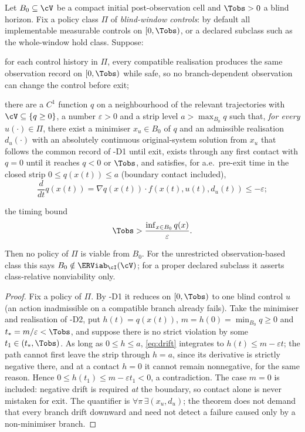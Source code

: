 \begin{theorem}\label{thm:delayed}
Let $B_0\subseteq\cV$ be a compact initial post-observation cell and $\Tobs>0$ a blind horizon. Fix a policy class $\Pi$ of \emph{blind-window controls}: by default all implementable measurable controls on $[0,\Tobs)$, or a declared subclass such as the whole-window hold class. Suppose:
\begin{description}[leftmargin=2.6em,itemsep=1pt]
\item[\hyp{D1}] for each control history in $\Pi$, every compatible realisation produces the same observation record on $[0,\Tobs)$ while safe, so no branch-dependent observation can change the control before exit;
\item[\hyp{D2}] there are a $C^1$ function $q$ on a neighbourhood of the relevant trajectories with $\cV\subseteq\{q\ge0\}$, a number $\varepsilon>0$ and a strip level $a>\max_{B_0}q$ such that, \emph{for every} $u(\cdot)\in\Pi$, there exist a minimiser $x_u\in B_0$ of $q$ and an admissible realisation $d_u(\cdot)$ with an absolutely continuous original-system solution from $x_u$ that follows the common record of \hyp{D1} until exit, exists through any first contact with $q=0$ until it reaches $q<0$ or $\Tobs$, and satisfies, for a.e.\ pre-exit time in the closed strip $0\le q(x(t))\le a$ (boundary contact included),
\begin{equation}\label{eq:drift}
\frac{d}{dt}q(x(t))=\nabla q(x(t))\cdot f(x(t),u(t),d_u(t))\le-\varepsilon;
\end{equation}
\item[\hyp{D3}] the timing bound
\begin{equation}\label{eq:timing}
\Tobs>\frac{\inf_{x\in B_0}q(x)}{\varepsilon}.
\end{equation}
\end{description}
Then no policy of $\Pi$ is viable from $B_0$. For the unrestricted observation-based class this says $B_0\notin\ERViab_\cI(\cV)$; for a proper declared subclass it asserts class-relative nonviability only.
\end{theorem}

\begin{proof}
Fix a policy of $\Pi$. By \hyp{D1} it reduces on $[0,\Tobs)$ to one blind control $u$ (an action inadmissible on a compatible branch already fails). Take the minimiser and realisation of \hyp{D2}, put $h(t)=q(x(t))$, $m=h(0)=\min_{B_0}q\ge0$ and $t_*=m/\varepsilon<\Tobs$, and suppose there is no strict violation by some $t_1\in(t_*,\Tobs)$. As long as $0\le h\le a$, \eqref{eq:drift} integrates to $h(t)\le m-\varepsilon t$; the path cannot first leave the strip through $h=a$, since its derivative is strictly negative there, and at a contact $h=0$ it cannot remain nonnegative, for the same reason. Hence $0\le h(t_1)\le m-\varepsilon t_1<0$, a contradiction. The case $m=0$ is included: negative drift is required \emph{at} the boundary, so contact alone is never mistaken for exit. The quantifier is $\forall\pi\,\exists(x_u,d_u)$; the theorem does not demand that every branch drift downward and need not detect a failure caused only by a non-minimiser branch.
\end{proof}

